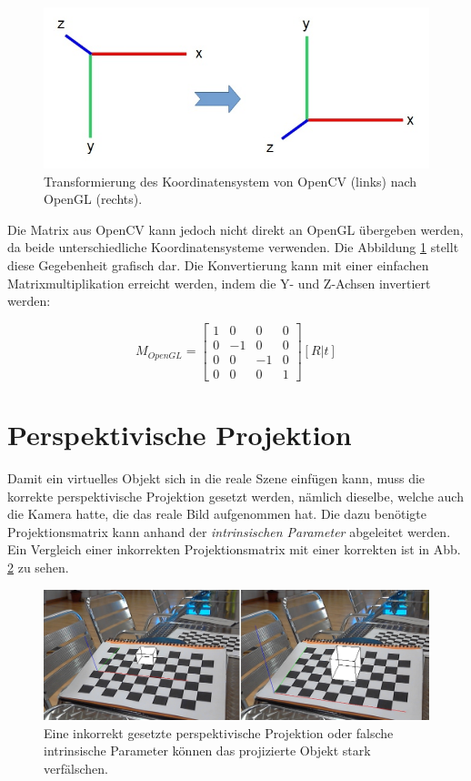 \begin{figure}[!ht]
\centering
\includegraphics[scale=0.5]{images/opencv-to-opengl.jpg} 
\caption{Transformierung des Koordinatensystem von OpenCV (links) nach OpenGL (rechts).}
\label{fig:opencv-to-opengl}
\end{figure}


Die Matrix aus OpenCV kann jedoch nicht direkt an OpenGL übergeben werden, da beide unterschiedliche Koordinatensysteme verwenden. Die Abbildung \ref{fig:opencv-to-opengl} stellt diese Gegebenheit grafisch dar. Die Konvertierung kann mit einer einfachen Matrixmultiplikation erreicht werden, indem die Y- und Z-Achsen invertiert werden:

\begin{equation}
M_{OpenGL}
=
\begin{bmatrix}
1 & 0 & 0 & 0 \\
0 & -1 & 0 & 0 \\
0 & 0 & -1 & 0 \\
0 & 0 & 0 & 1
\end{bmatrix} 
[R | t]
\end{equation}

 
\section{Perspektivische Projektion}

Damit ein virtuelles Objekt sich in die reale Szene einfügen kann, muss die korrekte perspektivische Projektion gesetzt werden, nämlich dieselbe, welche auch die Kamera hatte, die das reale Bild aufgenommen hat. Die dazu benötigte Projektionsmatrix kann anhand der \textit{intrinsischen Parameter} abgeleitet werden. Ein Vergleich einer inkorrekten Projektionsmatrix mit einer korrekten ist in Abb. \ref{fig:opengl-perspektive} zu sehen.


\begin{figure}[!ht]
\centering
\includegraphics[scale=0.5]{images/opengl-perspective.jpg} 
\caption{Eine inkorrekt gesetzte perspektivische Projektion oder falsche intrinsische Parameter können das projizierte Objekt stark verfälschen.}
\label{fig:opengl-perspektive}
\end{figure}


